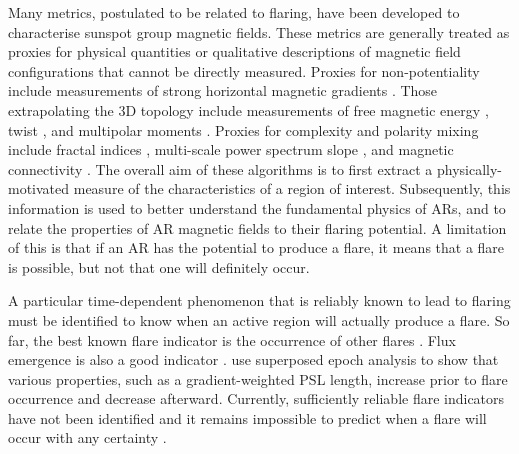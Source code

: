 Many metrics, postulated to be related to flaring, have been developed to characterise sunspot group magnetic fields. These metrics are generally treated as proxies for physical quantities or qualitative descriptions of magnetic field configurations that cannot be directly measured. Proxies for non-potentiality include measurements of strong horizontal magnetic gradients \citep{Gallagher:2002, Falconer:2008}. Those extrapolating the 3D topology include measurements of free magnetic energy \citep{Regnier_Priest:2007}, twist \citep{Conlon:2010b}, and multipolar moments \citep{Zhang:2009}.
Proxies for complexity and polarity mixing include fractal indices \citep{mcateer:2005b,Conlon:2008,Conlon:2010a}, multi-scale power spectrum slope \citep{Hewett:2008}, and magnetic connectivity \citep{Georgoulis:2007}.
The overall aim of these algorithms is to first extract a physically-motivated measure of the characteristics of a region of interest. Subsequently, this information is used to better understand the fundamental physics of \glspl{AR}, and to relate the properties of \gls{AR} magnetic fields to their flaring potential. A limitation of this is that if an AR has the potential to produce a flare, it means that a flare is possible, but not that one will definitely occur.

A particular time-dependent phenomenon that is reliably known to lead to flaring must be identified to know when an active region will actually produce a flare. So far, the best known flare indicator is the occurrence of other flares \citep{Gallagher:2002,Wheatland:2005}. Flux emergence is also a good indicator \citep{Li:2000,Schrijver:2005}. \citet{Mason:2010} use superposed epoch analysis to show that various properties, such as a gradient-weighted PSL length, increase prior to flare occurrence and decrease afterward. Currently, sufficiently reliable flare indicators have not been identified and it remains impossible to predict when a flare will occur with any certainty \cite{Messerotti:2009}.

